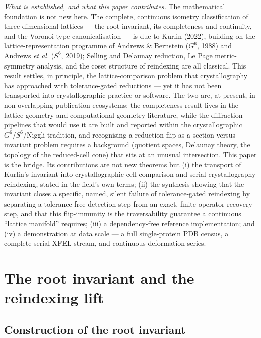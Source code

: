 \documentclass[11pt]{article}
\begin{document}
\emph{What is established, and what this paper contributes.} The mathematical
foundation is not new here. The complete, continuous isometry classification of
three-dimensional lattices --- the root invariant, its completeness and
continuity, and the Voronoi-type canonicalisation --- is due to Kurlin (2022),
building on the lattice-representation programme of Andrews \& Bernstein
($G^6$, 1988) and Andrews \textit{et al.} ($S^6$, 2019); Selling and Delaunay
reduction, Le Page metric-symmetry analysis, and the coset structure of
reindexing are all classical. This result settles, in principle, the
lattice-comparison problem that crystallography has approached with
tolerance-gated reductions --- yet it has not been transported into
crystallographic practice or software. The two are, at present, in
non-overlapping publication ecosystems: the completeness result lives in the
lattice-geometry and computational-geometry literature, while the diffraction
pipelines that would use it are built and reported within the crystallographic
$G^6/S^6$/Niggli tradition, and recognising a reduction flip as a
section-versus-invariant problem requires a background (quotient spaces, Delaunay
theory, the topology of the reduced-cell cone) that sits at an unusual
intersection. This paper is the bridge. Its contributions are not new theorems
but (i) the transport of Kurlin's invariant into crystallographic cell comparison
and serial-crystallography reindexing, stated in the field's own terms; (ii) the
synthesis showing that the invariant closes a specific, named, silent failure of
tolerance-gated reindexing by separating a tolerance-free detection step from an
exact, finite operator-recovery step, and that this flip-immunity is the
traversability guarantee a continuous ``lattice manifold'' requires; (iii) a
dependency-free reference implementation; and (iv) a demonstration at data scale
--- a full single-protein PDB census, a complete serial XFEL stream, and
continuous deformation series.

\section{The root invariant and the reindexing lift}

\subsection{Construction of the root invariant}
\end{document}
